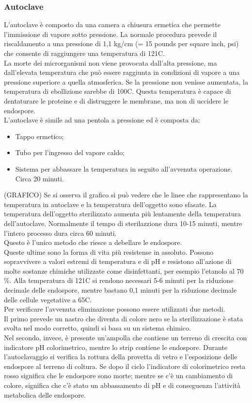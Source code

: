\subsubsection{Autoclave}
L'autoclave è composto da una camera a chiusura ermetica che permette l'immissione di vapore sotto pressione. La normale procedura prevede il riscaldamento a una pressione di 1,1 kg/cm (= 15 pounds per square inch, psi) che consente di raggiungere una temperatura di 121C. 
\\La morte dei microrganismi non viene provocata dall'alta pressione, ma dall'elevata temperatura che può essere raggiunta in condizioni di vapore a una pressione superiore a quella atmosferica. Se la pressione non venisse aumentata, la temperatura di ebollizione sarebbe di 100C. Questa temperatura è capace di dentaturare le proteine e di distruggere le membrane, ma non di uccidere le endospore. 
\\L'autoclave è simile ad una pentola a pressione ed è composta da:
\begin{itemize}
    \item Tappo ermetico; 
    \item Tubo per l'ingresso del vapore caldo; 
    \item Sistema per abbassare la temperatura in seguito all'avvenuta operazione. Circa 20 minuti. 
\end{itemize}
(GRAFICO) Se si osserva il grafico si può vedere che le linee che rappresentano la temperatura in autoclave e la temperatura dell'oggetto sono sfasate. La temperatura dell'oggetto sterilizzato aumenta più lentamente della temperatura dell'autoclave. Normalmente il tempo di sterilazzione dura 10-15 minuti, mentre l'intero processo dura circa 60 minuti. 
\\Questo è l'unico metodo che riesce a debellare le endospore. 
\\Queste ultime sono la forma di vita più resistense in assoluto. Possono sopravvivere a valori estremi di temperatura e di pH e resistono all'azione di molte sostanze chimiche utilizzate come disinfettanti, per esempio l'etanolo al 70$\%$. Alla temperatura di 121C si rendono necessari 5-6 minuti per la riduzione decimale delle endospore, mentre bastano 0,1 minuti per la riduzione decimale delle cellule vegetative a 65C.
\\Per verificare l'avvenuta eliminazione possono essere utilizzati due metodi. 
\\Il primo prevede un nastro che diventa di colore nero se la sterilizzazione è stata svolta nel modo corretto, quindi si basa su un sistema chimico. 
\\Nel secondo, invece, è presente un'ampolla che contiene un terreno di crescita con indicatore pH colorimetrico, mentre lo strip contiene le endospore. Durante l'autoclavaggio si verifica la rottura della provetta di vetro e l'esposizione delle endospore al terreno di coltura. Se dopo il ciclo l'indicatore di colorimetrico resta rosso significa che le endospore sono morte; mentre se c'è un cambiamento di colore, significa che c'è stato un abbassamento di pH e di conseguenza l'attività metabolica delle endospore.
